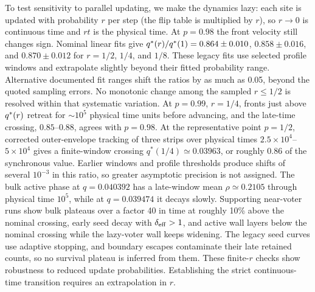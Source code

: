 To test sensitivity to parallel updating, we make the dynamics lazy: each site
is updated with probability $r$ per step (the flip table is multiplied
by $r$), so $r\to 0$ is continuous time and $rt$ is the physical time. At $p = 0.98$ the front
velocity still changes sign. Nominal linear fits give
$q^{*}(r)/q^{*}(1) = 0.864\pm0.010$, $0.858\pm0.016$,
and $0.870\pm0.012$ for $r = 1/2$, $1/4$, and $1/8$.
These legacy fits use selected profile windows and extrapolate slightly
beyond their fitted probability range. Alternative documented fit ranges
shift the ratios by as much as 0.05, beyond the quoted sampling errors.
No monotonic change among the sampled $r\le1/2$ is resolved within that
systematic variation. At
$p = 0.99$, $r = 1/4$, fronts just above $q^{*}(r)$ retreat for $\sim 10^5$ physical time units
before advancing, and the late-time crossing, $0.85$--$0.88$, agrees with $p = 0.98$. At the
representative point $p=1/2$, corrected outer-envelope tracking of three
strips over physical times $2.5\times10^4$--$5\times10^4$ gives a
finite-window crossing $q^*(1/4)\simeq0.03963$, or roughly 0.86 of the
synchronous value. Earlier windows and profile thresholds produce shifts
of several $10^{-3}$ in this ratio, so greater asymptotic precision is
not assigned. The bulk active phase at $q=0.040392$ has a late-window mean
$\rho\simeq0.2105$ through physical time $10^5$, while at $q=0.039474$
it decays slowly. Supporting near-voter runs show bulk plateaus over a
factor 40 in time at roughly 10\% above the nominal crossing, early seed
decay with $\delta_{\rm eff}>1$, and active wall layers below the nominal
crossing while the lazy-voter wall keeps widening. The legacy seed curves
use adaptive stopping, and boundary escapes contaminate their late retained
counts, so no survival plateau is inferred from them.
These finite-$r$ checks show robustness to reduced update probabilities.
Establishing the strict continuous-time transition requires an extrapolation
in $r$.

